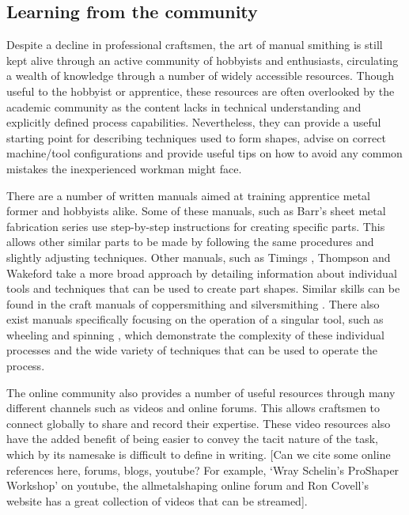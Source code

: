 \subsection{Learning from the community}
Despite a decline in professional craftsmen, the art of manual smithing is still kept alive through an active community of hobbyists and enthusiasts, circulating a wealth of knowledge through a number of widely accessible resources. Though useful to the hobbyist or apprentice, these resources are often overlooked by the academic community as the content lacks in technical understanding and explicitly defined process capabilities. Nevertheless, they can provide a useful starting point for describing techniques used to form shapes, advise on correct machine/tool configurations and provide useful tips on how to avoid any common mistakes the inexperienced workman might face.

There are a number of written manuals aimed at training apprentice metal former and hobbyists alike. Some of these manuals, such as Barr's sheet metal fabrication series \citep{Barr2013ProfessionalFabrication,Barr2019SheetProjects} use step-by-step instructions for creating specific parts. This allows other similar parts to be made by following the same procedures and slightly adjusting techniques. Other manuals, such as Timings \citep{Timings2008SheetMetalwork}, Thompson \citep{Thompson2007ManufacturingProfessionals} and Wakeford \citep{Wakeford1985SheetWork} take a more broad approach by detailing information about individual tools and techniques that can be used to create part shapes. Similar skills can be found in the craft manuals of coppersmithing \citep{Fuller1904ArtForms} and silversmithing \citep{Hill2014ManufacturingProcesses}. There also exist manuals specifically focusing on the operation of a singular tool, such as wheeling \citep{Longyard2014LearningWheel} and spinning \citep{Tuells1912MetalUsed}, which demonstrate the complexity of these individual processes and the wide variety of techniques that can be used to operate the process.

The online community also provides a number of useful resources through many different channels such as videos and online forums. This allows craftsmen to connect globally to share and record their expertise. These video resources also have the added benefit of being easier to convey the tacit nature of the task, which by its namesake is difficult to define in writing.
[Can we cite some online references here, forums, blogs, youtube? For example, `Wray Schelin's ProShaper Workshop' on youtube, the allmetalshaping online forum and Ron Covell's website has a great collection of videos that can be streamed].

